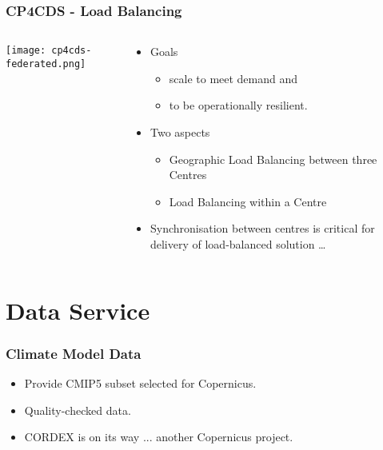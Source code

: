 \documentclass{beamer}
\begin{document}
\begin{frame}
\frametitle<presentation>{CP4CDS - Load Balancing}
  \begin{columns}[c]
    \begin{column}{.5\textwidth}
      \centering
      \texttt{[image: cp4cds-federated.png]}
    \end{column}
    \begin{column}{.5\textwidth}
      \begin{itemize}
        \item Goals
        \begin{itemize}
          \item scale to meet demand and
          \item to be operationally resilient.
        \end{itemize}
        \item Two aspects
        \begin{itemize}
          \item Geographic Load Balancing between three Centres
          \item Load Balancing within a Centre
        \end{itemize}
        \item Synchronisation between centres is critical for delivery of load-balanced solution \ldots
      \end{itemize}
    \end{column}
  \end{columns}

\end{frame}

\section{Data Service}

\begin{frame}
\frametitle<presentation>{Climate Model Data}

  \begin{itemize}
    \item Provide CMIP5 subset selected for Copernicus.
    \item Quality-checked data.
    \item CORDEX is on its way ... another Copernicus project.
  \end{itemize}

\end{frame}
\end{document}
